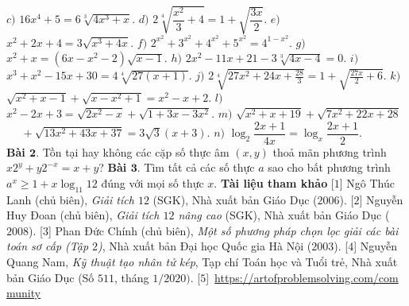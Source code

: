\begin{multicols}{2}
	\vskip 0.1cm
	$c)$ $16x^4+5=6\sqrt[3]{4x^3+x}.$
	\vskip 0.1cm
	$d)$ $ 2\sqrt[4]{\dfrac{x^{2}}{3}+4}=1+\sqrt{\dfrac{3x}{2}}.$
	\vskip 0.1cm
	$e)$ $x^2+2x+4=3\sqrt{x^3+4x}.$
	\vskip 0.1cm
	$f)$ $2^{x^2}+3^{x^2}+4^{x^2}+5^{x^2}=4^{1-x^2}.$
	\vskip 0.1cm
	$g)$ $x^2+x = (6x-x^2-2)\sqrt{x-1}.$
	\vskip 0.1cm
	$h)$ $2x^2-11x+21-3\sqrt[3]{4x-4}=0.$
	\vskip 0.1cm
	$i)$ $x^{3}+x^{2}-15x+30=4\sqrt[4]{27(x+1)}.$
	\vskip 0.1cm
	$j)$ $2\sqrt[4]{27x^2+24x+\frac{28}{3}}=1+\sqrt{\frac{27x}{2}+6}.$
	\vskip 0.1cm
	$k)$ $\sqrt{x^2+x-1}+\sqrt{x-x^2+1}=x^2-x+2.$
	\vskip 0.1cm
	$l)$ $x^2-2x+3=\sqrt{2x^2-x}+\sqrt{1+3x-3x^2}.$
	\vskip 0.1cm
	$m)$ $\sqrt{x^2+x+19}+\sqrt{7x^2+22x+28}$\\
	$\quad\,\,+\sqrt{13x^2+43x+37}=3\sqrt{3}(x+3)$.
	\vskip 0.1cm
	$n)$ $\log_2 \dfrac{2x+1}{4x} = \log_{x} \dfrac{2x+1}{2}.$\\
	\vskip 0.1cm
	\textbf{\color{hoccungpi}Bài $\pmb{2.}$} Tồn tại hay không các cặp số thực âm $(x,y)$ thoả mãn phương trình \linebreak$x2^y+y2^{-x}=x+y$?
	\vskip 0.1cm
	\textbf{\color{hoccungpi}Bài $\pmb{3.}$} Tìm tất cả các số thực $a$ sao cho bất phương trình $a^x\geq 1+x\log _{11}12$ đúng với mọi số thực $x$.
	\vskip 0.1cm
	\textbf{\color{hoccungpi}Tài liệu tham khảo}
	\vskip 0.1cm
	[$1$] Ngô Thúc Lanh (chủ biên), {\it Giải tích $12$ }(SGK), Nhà xuất bản Giáo Dục ($2006$).
	\vskip 0.1cm
	[$2$] Nguyễn Huy Đoan (chủ biên), {\it Giải tích $12$ nâng cao} (SGK), Nhà xuất bản Giáo Dục ($2008$).
	\vskip 0.1cm
	[$3$] Phan Đức Chính (chủ biên), {\it Một số phương pháp chọn lọc giải các bài toán sơ cấp (Tập $2$)}, Nhà xuất bản Đại học Quốc gia Hà Nội ($2003$). 
	\vskip 0.1cm
	[$4$] Nguyễn Quang Nam, {\it Kỹ thuật tạo nhân tử kép}, Tạp chí Toán học và Tuổi trẻ, Nhà xuất bản Giáo Dục (Số $511$, tháng $1/2020)$.
	\vskip 0.1cm
	[$5$]~\url{https://artofproblemsolving.com/com} \url{munity}
	\end{multicols}
